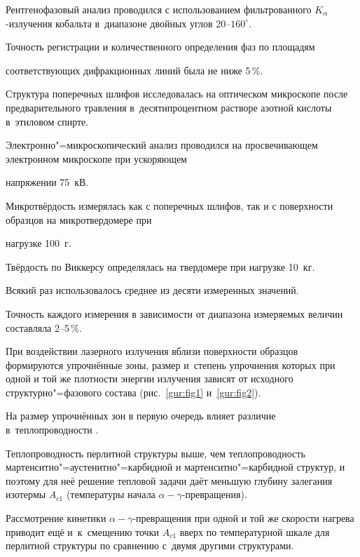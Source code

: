 Рентгенофазовый анализ проводился с использованием фильтрованного $K_{\alpha }$-излучения кобальта в~диапазоне двойных углов 20--$160^\circ$. 

Точность регистрации и количественного определения фаз по площадям

соответствующих дифракционных линий была не ниже 5\,{\%}.



Структура поперечных шлифов исследовалась на оптическом микроскопе после предварительного травления в~десятипроцентном растворе азотной кислоты в~этиловом спирте. 

Электронно"=микроскопический анализ проводился на просвечивающем электронном микроскопе при ускоряющем

напряжении 75~кВ. 

Микротвёрдость измерялась как с поперечных шлифов, так и с поверхности образцов на микротвердомере при

нагрузке 100~г. 

Твёрдость по Виккерсу определялась на твердомере при нагрузке 10~кг. 

Всякий раз использовалось среднее из десяти измеренных значений. 

Точность каждого измерения в зависимости от диапазона измеряемых величин составляла 2--5\,{\%}.



\smallskip




При воздействии лазерного излучения вблизи поверхности образцов формируются упрочнённые зоны, размер и~степень упрочнения которых при одной и той же плотности энергии излучения зависят от исходного структурно"=фазового состава (рис.~\ref{gur:fig1} и~\ref{gur:fig2}). 

На размер упрочнённых зон в первую очередь влияет различие в~теплопроводности \cite{gureev:bib4,gureev:bib5}. 

Теплопроводность перлитной структуры выше, чем теплопроводность мартенситно"=аустенитно"=карбидной и мартенситно"=карбидной структур, и поэтому для неё решение тепловой задачи даёт меньшую глубину залегания изотермы $A_{c1}$ (температуры начала $\alpha-\gamma $-превращения). 

Рассмотрение кинетики $\alpha -\gamma$-превращения при одной и той же скорости нагрева приводит ещё и~к~смещению точки $A_{c1}$ вверх по температурной шкале для перлитной структуры по сравнению с~двумя другими структурами. 

